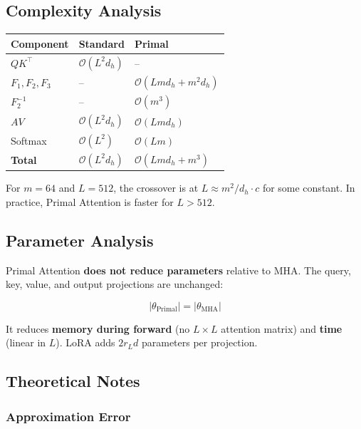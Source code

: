 \subsection{Complexity Analysis}

\begin{table}[H]
\centering
\small
\begin{tabular}{lll}
\toprule
\textbf{Component} & \textbf{Standard} & \textbf{Primal} \\
\midrule
$Q K^\top$ & $\mathcal{O}(L^2 d_h)$ & -- \\
$F_1, F_2, F_3$ & -- & $\mathcal{O}(L m d_h + m^2 d_h)$ \\
$F_2^{-1}$ & -- & $\mathcal{O}(m^3)$ \\
$A V$ & $\mathcal{O}(L^2 d_h)$ & $\mathcal{O}(L m d_h)$ \\
Softmax & $\mathcal{O}(L^2)$ & $\mathcal{O}(L m)$ \\
\textbf{Total} & $\mathcal{O}(L^2 d_h)$ & $\mathcal{O}(L m d_h + m^3)$ \\
\bottomrule
\end{tabular}
\end{table}

For $m = 64$ and $L = 512$, the crossover is at $L \approx m^2 / d_h \cdot c$ 
for some constant. In practice, Primal Attention is faster for $L > 512$.

\subsection{Parameter Analysis}

Primal Attention \textbf{does not reduce parameters} relative to MHA. The query, 
key, value, and output projections are unchanged:

\begin{equation}
|\theta_\text{Primal}| = |\theta_\text{MHA}|
\end{equation}

It reduces \textbf{memory during forward} (no $L \times L$ attention matrix) and 
\textbf{time} (linear in $L$). LoRA adds $2 r_L d$ parameters per projection.

\subsection{Theoretical Notes}

\subsubsection{Approximation Error}

